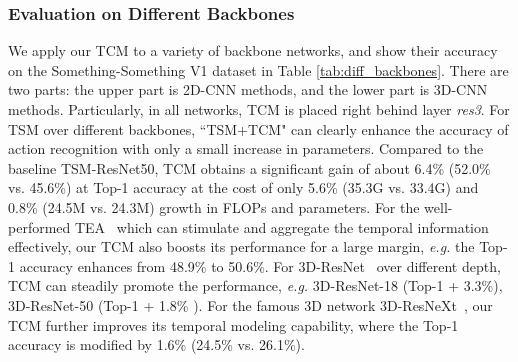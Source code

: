 \documentclass[journal]{IEEEtran}
\begin{document}
\subsubsection{Evaluation on Different Backbones} We apply our TCM to a variety of backbone networks, and show their accuracy on the Something-Something V1 dataset in Table \ref{tab:diff_backbones}. There are two parts: the upper part is 2D-CNN methods, and the lower part is 3D-CNN methods. Particularly, in all networks, TCM is placed right behind layer \textit{res3}. For TSM over different backbones, ``TSM+TCM" can clearly enhance the accuracy of action recognition with only a small increase in parameters. Compared to the baseline TSM-ResNet50, TCM obtains a significant gain of about 6.4\% (52.0\% vs. 45.6\%) at Top-1 accuracy at the cost of only 5.6\%  (35.3G vs. 33.4G) and 0.8\% (24.5M vs. 24.3M) growth in FLOPs and parameters. For the well-performed TEA~\cite{li2020tea} which can stimulate and aggregate the temporal information effectively, our TCM also boosts its performance for a large margin, \textit{e.g.} the Top-1 accuracy enhances from 48.9\% to 50.6\%. For 3D-ResNet~\cite{hara2018can} over different depth, TCM can steadily promote the performance, \textit{e.g.} 3D-ResNet-18 (Top-1 + 3.3\%), 3D-ResNet-50 (Top-1 + 1.8\% ). For the famous 3D network 3D-ResNeXt~\cite{crasto2019mars}, our TCM further improves its temporal modeling capability, where the Top-1 accuracy is modified by 1.6\% (24.5\% vs. 26.1\%).
\end{document}
